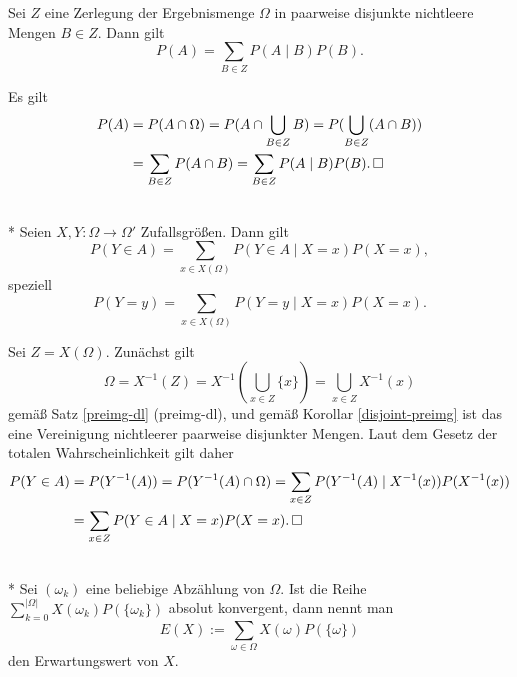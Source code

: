 \begin{Satz}%
Sei $Z$ eine Zerlegung der Ergebnismenge
$\Omega$ in paarweise disjunkte nichtleere Mengen $B\in Z$. Dann gilt
\[P(A) = \sum_{B\in Z} P(A\mid B)P(B).\]
\end{Satz}

\begin{Beweis}
Es gilt
\begin{align*}
P(A) &= P(A\cap\Omega) = P(A\cap\bigcup_{B\in Z} B)
= P(\bigcup_{B\in Z} (A\cap B))\\
&= \sum_{B\in Z} P(A\cap B)
= \sum_{B\in Z} P(A\mid B)P(B).\,\square
\end{align*}
\end{Beweis}

\begin{Korollar}%
\label{total-prob-rv}\mbox{}\\*
Seien $X,Y\colon\Omega\to\Omega'$ Zufallsgrößen. Dann gilt%
\[P(Y\in A) = \sum_{x\in X(\Omega)} P(Y\in A\mid X=x)P(X=x),\]
speziell
\[P(Y=y) = \sum_{x\in X(\Omega)} P(Y=y\mid X=x)P(X=x).\]
\end{Korollar}

\begin{Beweis}
Sei $Z=X(\Omega)$. Zunächst gilt
\[\Omega = X^{-1}(Z) = X^{-1}(\bigcup_{x\in Z} \{x\})
= \bigcup_{x\in Z} X^{-1}(x)\]
gemäß Satz \ref{preimg-dl} (preimg-dl), und gemäß Korollar
\ref{disjoint-preimg} ist das eine Vereinigung nichtleerer
paarweise disjunkter Mengen. Laut dem Gesetz der totalen
Wahrscheinlichkeit gilt daher%
\begin{align*}
P(Y\in A) &= P(Y^{-1}(A)) = P(Y^{-1}(A)\cap\Omega)
= \sum_{x\in Z} P(Y^{-1}(A)\mid X^{-1}(x))P(X^{-1}(x))\\
&= \sum_{x\in Z} P(Y\in A\mid X=x)P(X=x).\,\square
\end{align*}
\end{Beweis}

\begin{Definition}[Erwartungswert]%
\label{def:expected-value}\mbox{}\\*
Sei $(\omega_k)$ eine beliebige Abzählung von $\Omega$.
Ist die Reihe $\sum_{k=0}^{|\Omega|} X(\omega_k)P(\{\omega_k\})$
absolut konvergent, dann nennt man%
\[E(X) := \sum_{\omega\in\Omega} X(\omega)P(\{\omega\})\]
den Erwartungswert von $X$.
\end{Definition}

